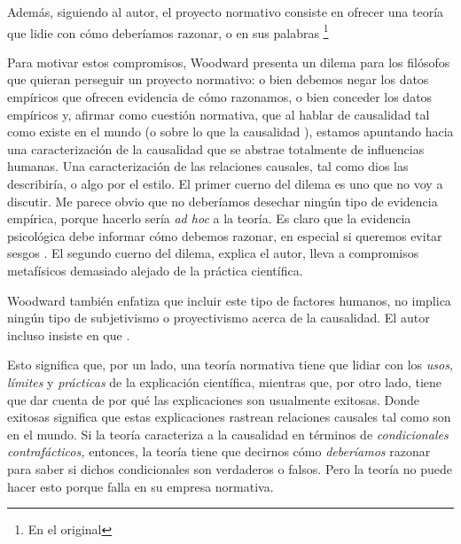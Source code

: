Además, siguiendo al autor, el proyecto normativo consiste 
en ofrecer una teoría que lidie con cómo deberíamos
razonar, o en sus palabras  \parencite[Énfasis en el
original][p.~21]{caushuman}\footnote{
En el original  
}

Para motivar estos compromisos, Woodward presenta un dilema para los filósofos que quieran
perseguir un proyecto normativo: o
bien debemos negar los datos empíricos que ofrecen evidencia
de cómo razonamos, o bien conceder los datos empíricos y,
afirmar como cuestión normativa, que al hablar de causalidad
tal como existe en el mundo (o sobre lo que la causalidad
), estamos apuntando hacia una caracterización de la
causalidad que se abstrae totalmente de influencias
humanas. Una caracterización de las relaciones causales,
tal como dios las describiría, o algo por el estilo. El
primer cuerno del dilema es uno que no voy a discutir. Me
parece obvio que no deberíamos desechar ningún tipo de
evidencia empírica, porque hacerlo sería \emph{ad hoc} a la
teoría. Es claro que la evidencia psicológica debe
informar cómo debemos razonar, en especial si queremos
evitar sesgos \parencite{nordell2021end}. El segundo cuerno
del dilema, explica el autor, lleva a compromisos
metafísicos demasiado alejado de la práctica científica.

Woodward también enfatiza que incluir este tipo de factores
humanos, no implica ningún tipo de subjetivismo o
proyectivismo acerca de la causalidad. El autor incluso
insiste en que 
\parencite[p.~22]{caushuman}. 

Esto significa que, por un lado, una teoría normativa tiene
que lidiar con los \emph{usos,} \emph{límites} y
\emph{prácticas} de la explicación científica, mientras que, por otro lado, tiene
que dar cuenta de por qué las explicaciones son usualmente
exitosas. Donde exitosas significa que estas
explicaciones rastrean relaciones causales tal como son en
el mundo. Si la teoría caracteriza a la causalidad en términos
de \emph{condicionales contrafácticos,} entonces, la
teoría tiene que decirnos cómo \emph{deberíamos} razonar
para saber si dichos condicionales son verdaderos o falsos.
Pero la teoría no puede hacer esto porque falla en su
empresa normativa. 

